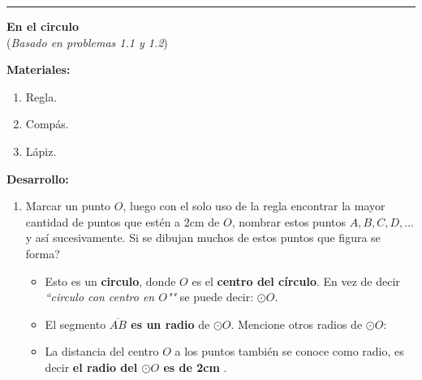 \rule{\textwidth}{0.1mm}
\begin{act_clase} \textbf{En el circulo}\\ (\textit{Basado en \cite{Aops_Geometria} problemas 1.1 y 1.2}){\ \\}
	
	\textbf{Materiales:} 
	\begin{enumerate}
		\item Regla.
		\item Compás.
		\item Lápiz.
	\end{enumerate}

	\textbf{Desarrollo:}
	\begin{enumerate}
		\item Marcar un punto $O$, luego con el solo uso de la regla encontrar la mayor cantidad de puntos que estén a 2cm de $O$, nombrar estos puntos $A,B,C,D,\dots$ y así sucesivamente. Si se dibujan muchos de estos puntos que figura se forma?
		\vspace{6cm}
		
		\begin{itemize}
			\item Esto es un \textbf{circulo}, donde $O$ es el \textbf{centro del círculo}. En vez de decir \textit{``circulo con centro en $O$""} se puede decir: $\odot O$. 
			\item El segmento \textbf{$\overline{AB}$ es un radio} de $\odot O$. Mencione otros radios de $\odot O$: \vspace{1cm}
			
			\item La distancia del centro $O$ a los puntos también se conoce como radio, es decir \textbf{el radio del $\odot O$ es de 2cm} .
		\end{itemize}
		

\end{enumerate}
\end{act_clase}
